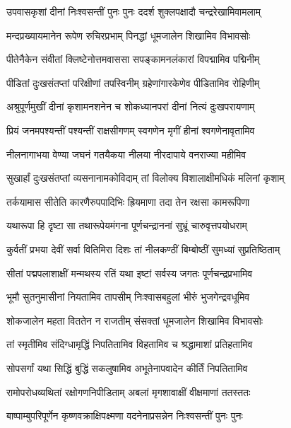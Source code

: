 \twolineshloka
{उपवासकृशां दीनां निःश्वसन्तीं पुनः पुनः}
{ददर्श शुक्लपक्षादौ चन्द्ररेखामिवामलाम्} %

\twolineshloka
{मन्दप्रख्यायमानेन रूपेण रुचिरप्रभाम्}
{पिनद्धां धूमजालेन शिखामिव विभावसोः} %

\twolineshloka
{पीतेनैकेन संवीतां क्लिष्टेनोत्तमवाससा}
{सपङ्कामनलंकारां विपद्मामिव पद्मिनीम्} %

\twolineshloka
{पीडितां दुःखसंतप्तां परिक्षीणां तपस्विनीम्}
{ग्रहेणांगारकेणेव पीडितामिव रोहिणीम्} %

\twolineshloka
{अश्रुपूर्णमुखीं दीनां कृशामनशनेन च}
{शोकध्यानपरां दीनां नित्यं दुःखपरायणाम्} %

\twolineshloka
{प्रियं जनमपश्यन्तीं पश्यन्तीं राक्षसीगणम्}
{स्वगणेन मृगीं हीनां श्वगणेनावृतामिव} %

\twolineshloka
{नीलनागाभया वेण्या जघनं गतयैकया}
{नीलया नीरदापाये वनराज्या महीमिव} %

\twolineshloka
{सुखार्हां दुःखसंतप्तां व्यसनानामकोविदाम्}
{तां विलोक्य विशालाक्षीमधिकं मलिनां कृशाम्} %

\twolineshloka
{तर्कयामास सीतेति कारणैरुपपादिभिः}
{ह्रियमाणा तदा तेन रक्षसा कामरूपिणा} %

\twolineshloka
{यथारूपा हि दृष्टा सा तथारूपेयमंगना}
{पूर्णचन्द्राननां सुभ्रूं चारुवृत्तपयोधराम्} %

\twolineshloka
{कुर्वतीं प्रभया देवीं सर्वा वितिमिरा दिशः}
{तां नीलकण्ठीं बिम्बोष्ठीं सुमध्यां सुप्रतिष्ठिताम्} %

\twolineshloka
{सीतां पद्मपलाशाक्षीं मन्मथस्य रतिं यथा}
{इष्टां सर्वस्य जगतः पूर्णचन्द्रप्रभामिव} %

\twolineshloka
{भूमौ सुतनुमासीनां नियतामिव तापसीम्}
{निःश्वासबहुलां भीरुं भुजगेन्द्रवधूमिव} %

\twolineshloka
{शोकजालेन महता विततेन न राजतीम्}
{संसक्तां धूमजालेन शिखामिव विभावसोः} %

\twolineshloka
{तां स्मृतीमिव संदिग्धामृद्धिं निपतितामिव}
{विहतामिव च श्रद्धामाशां प्रतिहतामिव} %

\twolineshloka
{सोपसर्गां यथा सिद्धिं बुद्धिं सकलुषामिव}
{अभूतेनापवादेन कीर्तिं निपतितामिव} %

\twolineshloka
{रामोपरोधव्यथितां रक्षोगणनिपीडिताम्}
{अबलां मृगशावाक्षीं वीक्षमाणां ततस्ततः} %

\twolineshloka
{बाष्पाम्बुपरिपूर्णेन कृष्णवक्राक्षिपक्ष्मणा}
{वदनेनाप्रसन्नेन निःश्वसन्तीं पुनः पुनः} %

